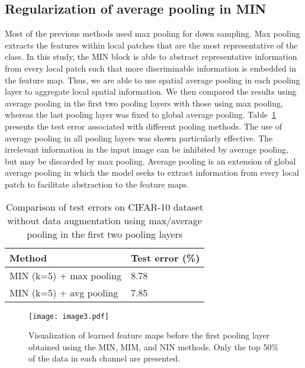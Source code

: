 \documentclass[10pt,twocolumn,letterpaper]{article}
\begin{document}
\subsection{Regularization of average pooling in MIN}
	Most of the previous methods used max pooling for down sampling. Max pooling extracts the features within local patches that are the most representative of the class.  In this study, the MIN block is able to abstract representative information from every local patch such that more discriminable information is embedded in the feature map. Thus, we are able to use spatial average pooling in each pooling layer to aggregate local spatial information. We then compared the results using average pooling in the first two pooling layers with those using max pooling, whereas the last pooling layer was fixed to global average pooling. Table~\ref{tab:avg} presents the test error associated with different pooling methods. The use of average pooling in all pooling layers was shown particularly effective. The irrelevant information in the input image can be inhibited by average pooling, but may be discarded by max pooling.  Average pooling is an extension of global average pooling in which the model seeks to extract information from every local patch to facilitate abstraction to the feature maps.

\begin{table}
\begin{center}
\caption{Comparison of test errors on CIFAR-10 dataset without data augmentation using max/average pooling in the first two pooling layers}
\begin{tabular}{|p{1.8in}|p{0.8in}|} \hline 
Method & Test error (\%) \\ \hline 
MIN (k=5)  + max pooling & 8.78 \\ \hline 
MIN (k=5)  + avg pooling & 7.85 \\ \hline 
\end{tabular}
\label{tab:avg}
\end{center}
\end{table}

\begin{figure*}
\begin{center}
	\texttt{[image: image3.pdf]}
\end{center}
   \caption{Visualization of learned feature maps before the first pooling layer obtained using the MIN, MIM, and NIN methods. Only the top 50\% of the data in each channel are presented.}
\label{fig:cifar}
\end{figure*}
\end{document}
